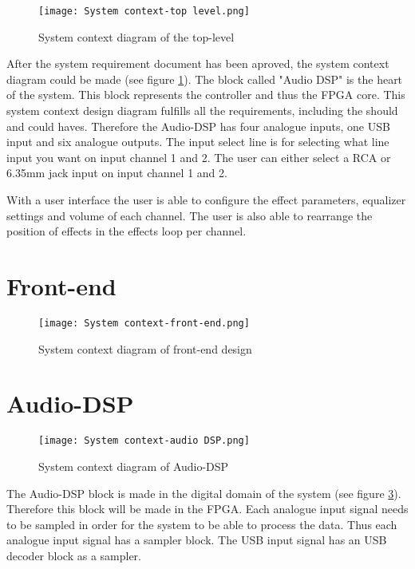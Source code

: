 \begin{figure}[h]
    \texttt{[image: System context-top level.png]}
    \caption{System context diagram of the top-level}
    \label{fig:sys-context-top}
\end{figure}

After the system requirement document has been aproved, the system context diagram could be made (see figure \ref*{fig:sys-context-top}).
The block called "Audio DSP" is the heart of the system.
This block represents the controller and thus the FPGA core.
This system context design diagram fulfills all the requirements, including the should and could haves.
Therefore the Audio-DSP has four analogue inputs, one USB input and six analogue outputs.
The input select line is for selecting what line input you want on input channel 1 and 2.
The user can either select a RCA or 6.35mm jack input on input channel 1 and 2.

With a user interface the user is able to configure the effect parameters, equalizer settings and volume of each channel.
The user is also able to rearrange the position of effects in the effects loop per channel.

\section{Front-end}
\begin{figure}[h]
    \texttt{[image: System context-front-end.png]}
    \caption{System context diagram of front-end design}
    \label{fig:system-context-front-end}
\end{figure}

\section{Audio-DSP}
\begin{figure}[h]
    \texttt{[image: System context-audio DSP.png]}
    \caption{System context diagram of Audio-DSP}
    \label{fig:sys-context-audio-dsp}
\end{figure}

The Audio-DSP block is made in the digital domain of the system (see figure \ref*{fig:sys-context-audio-dsp}). 
Therefore this block will be made in the FPGA. Each analogue input signal needs to be sampled in order for the system to be able to process the data. 
Thus each analogue input signal has a sampler block. The USB input signal has an USB decoder block as a sampler. 

